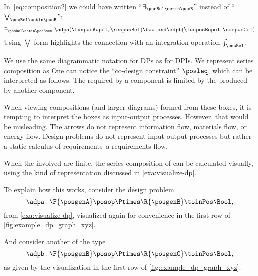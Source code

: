 In~\cref{eq:composition2} we could have written ``$\exists_{\posBel\setin \posB}$'' instead of ``$\bigvee_{\posBel\setin \posB}$'':
\begin{equation}
    \exists_{\posBel \setin \posBset}\  \adpa(\funposAopel,\resposBel) \booland \adpb(\funposBopel,\resposCel)
\end{equation}
Using $\bigvee$ form highlights the connection with an integration operation $\int_\posBel$.

We use the same diagrammatic notation for DPs as for DPIs.
We represent series composition as
%
%
One can notice the ``co-design constraint'' $\posleq$, which can be interpreted as follows.
The  required by a component is limited by the  produced by another component.

When viewing compositions (and larger diagrams) formed from these boxes, it is tempting to interpret the boxes as input-output processes.
However, that would be misleading.
The arrows do not represent information flow, materials flow, or energy flow.
Design problems do not represent input-output processes but rather a static calculus of requirements--a requirements flow.

When the  involved are finite, the series composition of  can be calculated visually, using the kind of representation discussed in \cref{exa:visualize-dp}.

To explain how this works, consider the design problem
\begin{equation}
    \adpa \colon \F{\posgenA} \posop \Ptimes  \R{\posgenB} \toinPos \Bool,
\end{equation}
from \cref{exa:visualize-dp}, visualized again for convenience in the first row of \cref{fig:example_dp_graph_xyz}.

And consider another  of the type
\begin{equation}
    \adpb \colon \F{\posgenB} \posop \Ptimes  \R{\posgenC} \toinPos \Bool,
\end{equation}
as given by the visualization in the first row of \cref{fig:example_dp_graph_xyz}.

